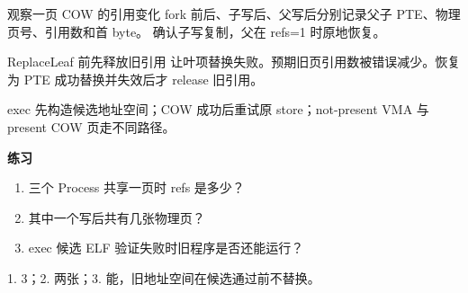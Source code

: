 
\begin{experimentbox}{观察一页 COW 的引用变化}
fork 前后、子写后、父写后分别记录父子 PTE、物理页号、引用数和首 byte。
确认子写复制，父在 refs=1 时原地恢复。
\end{experimentbox}

\begin{faultinjectionbox}{ReplaceLeaf 前先释放旧引用}
让叶项替换失败。预期旧页引用数被错误减少。恢复为 PTE 成功替换并失效后才
release 旧引用。
\end{faultinjectionbox}

\begin{pitfallbox}
exec 先构造候选地址空间；COW 成功后重试原 store；not-present VMA 与 present
COW 页走不同路径。
\end{pitfallbox}

\textbf{练习}
\begin{enumerate}[leftmargin=2.2em]
  \item 三个 Process 共享一页时 refs 是多少？
  \item 其中一个写后共有几张物理页？
  \item exec 候选 ELF 验证失败时旧程序是否还能运行？
\end{enumerate}
\begin{answerbox}
1. 3；2. 两张；3. 能，旧地址空间在候选通过前不替换。
\end{answerbox}
